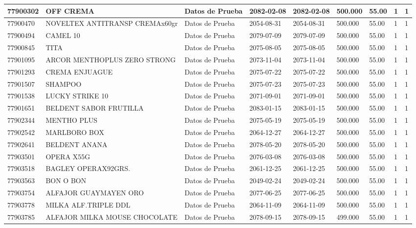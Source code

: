 \documentclass[a4paper,12pt]{article}
\begin{document}
\begin{landscape}
\begin{longtable}{|p{4cm}|p{2.5cm}|p{2.5cm}|p{1.8cm}|p{1.8cm}|p{1cm}|p{1cm}|p{3cm}|p{3cm}||}
77900302 & OFF CREMA & Datos de Prueba & 2082-02-08 & 2082-02-08 & 500.000 & 55.00 & 1 & 1 \\ \hline 
77900470 & NOVELTEX ANTITRANSP CREMAx60gr & Datos de Prueba & 2054-08-31 & 2054-08-31 & 500.000 & 55.00 & 1 & 1 \\ \hline 
77900494 & CAMEL 10 & Datos de Prueba & 2079-07-09 & 2079-07-09 & 500.000 & 55.00 & 1 & 1 \\ \hline 
77900845 & TITA & Datos de Prueba & 2075-08-05 & 2075-08-05 & 500.000 & 55.00 & 1 & 1 \\ \hline 
77901095 & ARCOR MENTHOPLUS ZERO STRONG & Datos de Prueba & 2073-11-04 & 2073-11-04 & 500.000 & 55.00 & 1 & 1 \\ \hline 
77901293 & CREMA ENJUAGUE & Datos de Prueba & 2075-07-22 & 2075-07-22 & 500.000 & 55.00 & 1 & 1 \\ \hline 
77901507 & SHAMPOO & Datos de Prueba & 2075-07-23 & 2075-07-23 & 500.000 & 55.00 & 1 & 1 \\ \hline 
77901538 & LUCKY STRIKE 10 & Datos de Prueba & 2071-09-01 & 2071-09-01 & 500.000 & 55.00 & 1 & 1 \\ \hline 
77901651 & BELDENT SABOR FRUTILLA & Datos de Prueba & 2083-01-15 & 2083-01-15 & 500.000 & 55.00 & 1 & 1 \\ \hline 
77902344 & MENTHO PLUS & Datos de Prueba & 2075-05-19 & 2075-05-19 & 500.000 & 55.00 & 1 & 1 \\ \hline 
77902542 & MARLBORO BOX & Datos de Prueba & 2064-12-27 & 2064-12-27 & 500.000 & 55.00 & 1 & 1 \\ \hline 
77902641 & BELDENT ANANA & Datos de Prueba & 2078-05-20 & 2078-05-20 & 500.000 & 55.00 & 1 & 1 \\ \hline 
77903501 & OPERA X55G & Datos de Prueba & 2076-03-08 & 2076-03-08 & 500.000 & 55.00 & 1 & 1 \\ \hline 
77903518 & BAGLEY OPERAX92GRS. & Datos de Prueba & 2061-12-25 & 2061-12-25 & 500.000 & 55.00 & 1 & 1 \\ \hline 
77903563 & BON O BON & Datos de Prueba & 2049-02-24 & 2049-02-24 & 500.000 & 55.00 & 1 & 1 \\ \hline 
77903754 & ALFAJOR GUAYMAYEN ORO & Datos de Prueba & 2077-06-25 & 2077-06-25 & 500.000 & 55.00 & 1 & 1 \\ \hline 
77903778 & MILKA ALF.TRIPLE DDL & Datos de Prueba & 2064-11-09 & 2064-11-09 & 500.000 & 55.00 & 1 & 1 \\ \hline 
77903785 & ALFAJOR MILKA MOUSE CHOCOLATE & Datos de Prueba & 2078-09-15 & 2078-09-15 & 499.000 & 55.00 & 1 & 1 \\ \hline 

\end{longtable}
\end{landscape}
\end{document}
